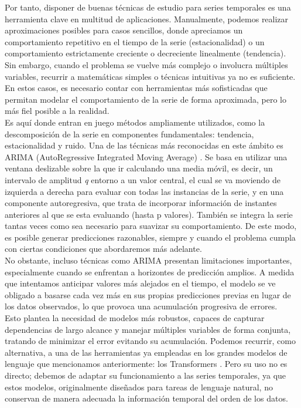 Por tanto, disponer de buenas técnicas de estudio para series temporales es una herramienta clave en multitud de aplicaciones. Manualmente, podemos realizar aproximaciones posibles para casos sencillos, donde apreciamos un comportamiento repetitivo en el tiempo de la serie (estacionalidad) o un comportamiento estrictamente creciente o decreciente linealmente (tendencia). Sin embargo, cuando el problema se vuelve más complejo o involucra múltiples variables, recurrir a matemáticas simples o técnicas intuitivas ya no es suficiente. En estos casos, es necesario contar con herramientas más sofisticadas que permitan modelar el comportamiento de la serie de forma aproximada, pero lo más fiel posible a la realidad.\\

Es aquí donde entran en juego métodos ampliamente utilizados, como la descomposición de la serie en componentes fundamentales: tendencia, estacionalidad y ruido. Una de las técnicas más reconocidas en este ámbito es ARIMA (AutoRegressive Integrated Moving Average) \cite{10.5555/574978}. Se basa en utilizar una ventana deslizable sobre la que ir calculando una media móvil, es decir, un intervalo de amplitud \textit{q} entorno a un valor central, el cual se va moviendo de izquierda a derecha para evaluar con todas las instancias de la serie, y en una componente autoregresiva, que trata de incorporar información de instantes anteriores al que se esta evaluando (hasta p valores). También se integra la serie tantas veces como sea necesario para suavizar su comportamiento. De este modo, es posible generar predicciones razonables, siempre y cuando el problema cumpla con ciertas condiciones que abordaremos más adelante.\\

No obstante, incluso técnicas como ARIMA presentan limitaciones importantes, especialmente cuando se enfrentan a horizontes de predicción amplios. A medida que intentamos anticipar valores más alejados en el tiempo, el modelo se ve obligado a basarse cada vez más en sus propias predicciones previas en lugar de los datos observados, lo que provoca una acumulación progresiva de errores.\\

Esto plantea la necesidad de modelos más robustos, capaces de capturar dependencias de largo alcance y manejar múltiples variables de forma conjunta, tratando de minimizar el error evitando su acumulación. Podemos recurrir, como alternativa, a una de las herramientas ya empleadas en los grandes modelos de lenguaje que mencionamos anteriormente: los Transformers \cite{vaswani2023attentionneed}. Pero su uso no es directo; debemos de adaptar su funcionamiento a las series temporales, ya que estos modelos, originalmente diseñados para tareas de lenguaje natural, no conservan de manera adecuada la información temporal del orden de los datos.
